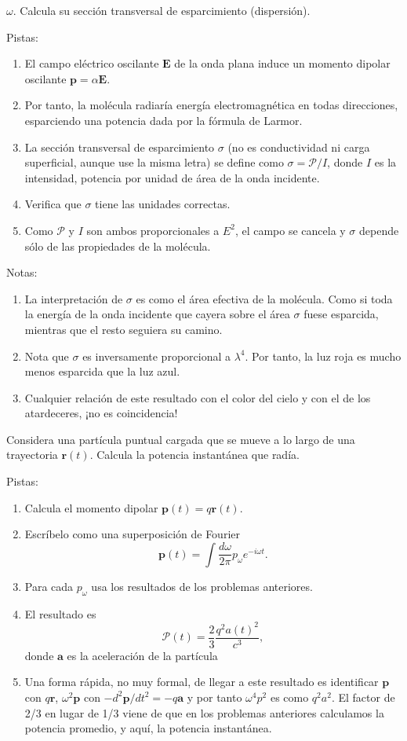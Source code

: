 \documentclass{exam}
\newenvironment{pistas}{\par\noindent Pistas:\begin{enumerate}} {\end{enumerate}}
\newenvironment{notas}{\par\noindent Notas:\begin{enumerate}} {\end{enumerate}}
\begin{document}
\begin{questions}
  $\omega$. Calcula su sección transversal de esparcimiento (dispersión).
  \begin{pistas}
  \item El campo eléctrico oscilante $\bm E$ de la onda plana induce
    un momento dipolar oscilante $\bm p=\alpha\bm E$.
  \item Por tanto, la molécula radiaría energía electromagnética en
    todas direcciones, esparciendo una potencia dada por la fórmula de
    Larmor.
  \item La sección transversal de esparcimiento $\sigma$ (no es
    conductividad ni carga superficial, aunque use la misma letra) se
    define como $\sigma=\mathcal P/I$, donde $I$ es la intensidad,
   potencia por unidad de área de la onda incidente.
  \item Verifica que $\sigma$ tiene las unidades correctas.
  \item Como $\mathcal P$ y $I$ son ambos proporcionales a $E^2$, el
    campo se cancela y $\sigma$ depende sólo de las propiedades de la molécula.
  \end{pistas}
  \begin{notas}
  \item La interpretación de $\sigma$ es como el área efectiva de la
    molécula. Como si toda la energía de la onda incidente que cayera sobre el
    área $\sigma$ fuese esparcida, mientras que el resto seguiera su camino.
  \item Nota que $\sigma$ es inversamente proporcional a
    $\lambda^4$. Por tanto, la luz roja es mucho menos esparcida que
    la luz azul.
  \item Cualquier relación de este resultado con el color del cielo y con el de
    los atardeceres, ¡no es coincidencia!
  \end{notas}


\question\label{x} Considera una partícula puntual cargada que se mueve a lo
  largo de una trayectoria $\bm r(t)$. Calcula la potencia instantánea
  que radía.
  \begin{pistas}
  \item Calcula el momento dipolar $\bm p(t)=q\bm r(t)$.
  \item Escríbelo como una superposición de Fourier
    $$\bm p(t)=\int \frac{d\omega}{2\pi}p_\omega e^{-i\omega t}.$$
  \item Para cada $p_\omega$ usa los resultados de los problemas
    anteriores.
  \item El resultado es
    $$\mathcal P(t)=\frac{2}{3}\frac{q^2 a(t)^2}{c^3},$$
    donde $\bm a$ es la aceleración de la partícula
  \item Una forma rápida, no muy formal, de llegar a este resultado es identificar
     $\bm p$ con $q\bm r$, $\omega^2\bm  p$ con $-d^2\bm
    p/dt^2=-q\bm a$ y por tanto $\omega^4 p^2$ es como $q^2 a^2$. El
    factor de 2/3 en lugar de 1/3 viene de que en los problemas
    anteriores calculamos la potencia promedio, y aquí, la potencia
    instantánea.
  \end{pistas}

\end{questions}
\end{document}
